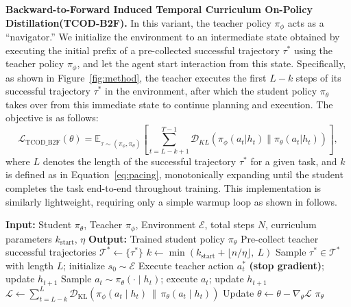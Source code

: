 \documentclass{article} %
\newcommand{\ours}{TCOD\xspace}
\newcommand{\oursfull}{Temporal Curriculum On-Policy Distillation\xspace}
\begin{document}
\textbf{Backward-to-Forward Induced \oursfull (\ours-B2F).}
In this variant, the teacher policy $\pi_\phi$ acts as a ``navigator.'' 
We initialize the environment to an intermediate state obtained by executing the initial prefix of a pre-collected successful trajectory $\tau^*$ using the teacher policy $\pi_\phi$, and let the agent start interaction from this state. 
Specifically, as shown in Figure~\ref{fig:method}, the teacher executes the first $L-k$ steps of its successful trajectory $\tau^*$ in the environment, after which the student policy $\pi_\theta$ takes over from this immediate state to continue planning and execution. The objective is as follows:
\begin{equation}
\mathcal{L}_{\text{TCOD\_B2F}}(\theta) = \mathbb{E}_{\tau \sim (\pi_\phi, \pi_\theta)} \left[ \sum_{t=L-k+1}^{T-1} \mathcal{D}_{KL} \left( \pi_\phi(a_t|h_t) \parallel \pi_\theta(a_t|h_t) \right) \right],
\end{equation}
where $L$ denotes the length of the successful trajectory $\tau^*$ for a given task, and $k$ is defined as in Equation~\ref{eq:pacing}, monotonically expanding until 
the student completes the task end-to-end throughout training.
This implementation is similarly lightweight, requiring only a simple warmup loop as shown in follows.
\begin{algorithm}[h]
\caption{Temporal Curriculum On-Policy Distillation: \ours-B2F}
\label{alg:tcod_b2f}
\begin{algorithmic}[1]
\STATE \textbf{Input:} Student $\pi_\theta$, Teacher $\pi_\phi$, Environment $\mathcal{E}$,
       total steps $N$, curriculum parameters $k_{\text{start}}$, $\eta$
\STATE \textbf{Output:} Trained student policy $\pi_\theta$
\STATE Pre-collect teacher successful trajectories $\mathcal{T}^* \leftarrow \{\tau^*\}$
    \STATE $k \leftarrow \min\!\left(k_{\text{start}} + \lfloor n / \eta \rfloor,\ L\right)$
    \STATE Sample $\tau^* \in \mathcal{T}^*$ with length $L$; initialize $s_0 \sim \mathcal{E}$
        \STATE Execute teacher action $a_t^*$ \textbf{(stop gradient)}; update $h_{t+1}$
    \ENDFOR
        \STATE Sample $a_t \sim \pi_\theta(\cdot \mid h_t)$; execute $a_t$; update $h_{t+1}$
    \ENDFOR
    \STATE $\mathcal{L} \leftarrow \sum_{t=L-k}^{L} \mathcal{D}_{\mathrm{KL}}\!\left(\pi_\phi(a_t \mid h_t) \,\|\, \pi_\theta(a_t \mid h_t)\right)$
    \STATE Update $\theta \leftarrow \theta - \nabla_\theta \mathcal{L}$
\ENDFOR
\RETURN $\pi_\theta$
\end{algorithmic}
\end{algorithm}
\end{document}
